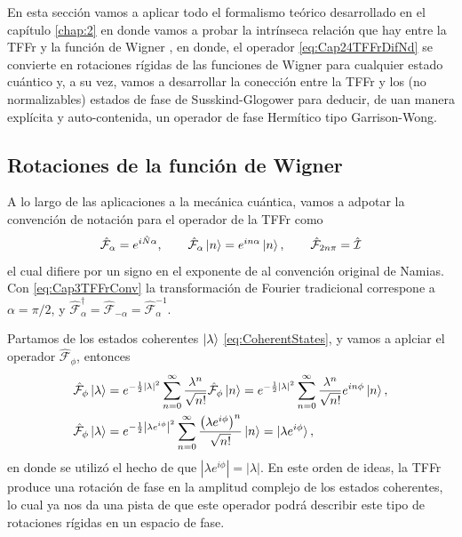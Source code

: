             En esta sección vamos a aplicar todo el formalismo teórico desarrollado en el capítulo \ref{chap:2} en donde vamos a probar la intrínseca relación que hay entre la TFFr y la función de Wigner \cite{ozaktas2001fractional}, en donde, el operador \ref{eq:Cap24TFFrDifNd} se convierte en rotaciones rígidas de las funciones de Wigner para cualquier estado cuántico y, a su vez, vamos a desarrollar la conección entre la TFFr  y los (no normalizables) estados de fase de Susskind-Glogower para deducir, de uan manera explícita y auto-contenida, un operador de fase Hermítico tipo Garrison-Wong.
            
            \subsection{Rotaciones de la función de Wigner}

                A lo largo de las aplicaciones a la mecánica cuántica, vamos a adpotar la convención de notación para el operador de la TFFr como
                \begin{equation}\label{eq:Cap3TFFrConv}
                    \hat{\mathcal{F}}_\alpha = e^{i\hat{N}\alpha}, \qquad \hat{\mathcal{F}}_\alpha \ket{n} = e^{in\alpha}\ket{n}, \qquad \hat{\mathcal{F}}_{2n\pi} = \hat{\mathcal{I}}
                \end{equation}
                el cual difiere por un signo en el exponente de al convención original de Namias. Con \ref{eq:Cap3TFFrConv} la transformación de Fourier tradicional correspone a $\alpha = \pi/2$, y $\hat{\mathcal{F}}_\alpha^\dagger = \hat{\mathcal{F}}_{-\alpha} = \hat{\mathcal{F}}_\alpha^{-1}$.

                Partamos de los estados coherentes $\ket{\lambda}$ \ref{eq:CoherentStates}, y vamos a aplciar el operador $\hat{\mathcal{F}}_\phi$, entonces
                \begin{align}\label{eq:Cap3WignerRotCoherentes}
                    & \hat{\mathcal{F}}_\phi \ket{\lambda} = e^{-\frac{1}{2}|\lambda|^2}\sum_{n=0}^{\infty} \frac{\lambda^n}{\sqrt{n!}}\hat{\mathcal{F}}_\phi \ket{n} = e^{-\frac{1}{2}|\lambda|^2}\sum_{n=0}^{\infty} \frac{\lambda^n}{\sqrt{n!}}e^{in\phi} \ket{n}, \nonumber\\
                    & \hat{\mathcal{F}}_\phi \ket{\lambda} = e^{-\frac{1}{2}\left|\lambda e^{i\phi} \right|^2} \sum_{n=0}^{\infty} \frac{\left( \lambda e^{i\phi} \right)^n}{\sqrt{n!}}\ket{n} = \ket{\lambda e^{i\phi}},
                \end{align}
                en donde se utilizó el hecho de que $\left|\lambda e^{i\phi}\right| = |\lambda|$. En este orden de ideas, la TFFr produce una rotación de fase en la amplitud complejo de los estados coherentes, lo cual ya nos da una pista de que este operador podrá describir este tipo de rotaciones rígidas en un espacio de fase.

